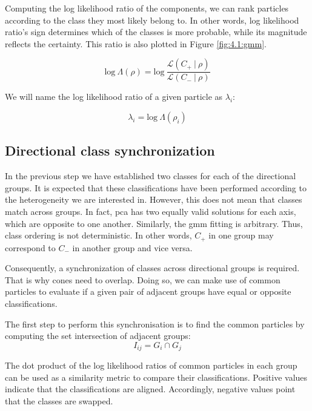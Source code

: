 \documentclass[../main.tex]{subfiles}
\begin{document}
Computing the log likelihood ratio of the components, we can rank particles according to the class they most likely belong to. In other words, log likelihood ratio's sign determines which of the classes is more probable, while its magnitude reflects the certainty. This ratio is also plotted in Figure \ref{fig:4.1:gmm}.

\begin{equation}\label{fig:4.1:likelihood}
    \text{log}\ \Lambda(\rho) = \text{log}\ \frac{\mathcal{L}(C_+\ |\ \rho)}{\mathcal{L}(C_-\ |\ \rho)}
\end{equation}

We will name the log likelihood ratio of a given particle as $\lambda_i$:

\begin{equation}
    \lambda_i = \text{log}\ \Lambda(\rho_i) 
\end{equation}

\subsection{Directional class synchronization}
In the previous step we have established two classes for each of the directional groups. It is expected that these classifications have been performed according to the heterogeneity we are interested in. However, this does not mean that classes match across groups. In fact, \gls{pca} has two equally valid solutions for each axis, which are opposite to one another. Similarly, the \gls{gmm} fitting is arbitrary. Thus, class ordering is not deterministic. In other words, $C_+$ in one group may correspond to $C_-$ in another group and vice versa.

Consequently, a synchronization of classes across directional groups is required. That is why cones need to overlap. Doing so, we can make use of common particles to evaluate if a given pair of adjacent groups have equal or opposite classifications. 

The first step to perform this synchronisation is to find the common particles by computing the set intersection of adjacent groups:
\begin{equation}\label{eq:4.1:intersection}
    I_{ij} = G_i \cap G_j
\end{equation}

The dot product of the log likelihood ratios of common particles in each group can be used as a similarity metric to compare their classifications. Positive values indicate that the classifications are aligned. Accordingly, negative values point that the classes are swapped. 
\end{document}
